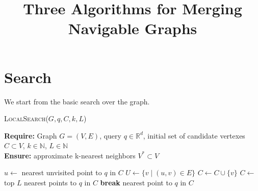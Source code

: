 \documentclass{article}
\title{Three Algorithms for Merging Navigable Graphs}
\author{}
\date{}
\begin{document}
\maketitle

\section {Search}



We start from the basic search over the graph. 

\begin{algorithm}
\caption{\textsc{LocalSearch}($G, q, C, k, L$)}\label{alg:local_search}
\textbf{Require:} Graph $G = (V, E)$, query $q \in \mathbb{R}^d$, initial set of candidate vertexes $C \subset V$,  $k \in \mathbb{N}$, $L \in \mathbb{N}$ \\
\textbf{Ensure:} approximate k-nearest neighbors $V^* \subset V$
\begin{algorithmic}[1]
    \State $u \gets$ nearest unvisited point to $q$ in $C$
    \State $U \gets \{v \mid (u, v) \in E\}$
            \State $C \gets C \cup \{v\}$
        \EndIf
    \EndFor
        \State $C \gets$ top $L$ nearest points to $q$ in $C$
    \EndIf
        \State \textbf{break}
    \EndIf
\EndWhile
\State \Return nearest point to $q$ in $C$
\end{algorithmic}
\end{algorithm}
\end{document}
